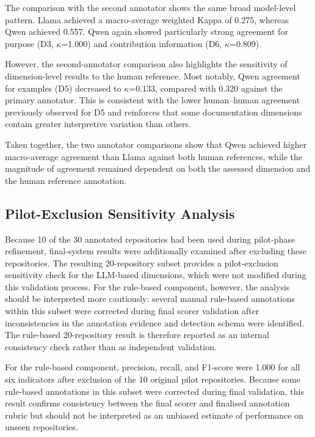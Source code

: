The comparison with the second annotator shows the same broad
model-level pattern. Llama achieved a macro-average weighted Kappa
of 0.275, whereas Qwen achieved 0.557. Qwen again showed particularly
strong agreement for purpose (D3, $\kappa$=1.000) and contribution
information (D6, $\kappa$=0.809).

However, the second-annotator comparison also highlights the
sensitivity of dimension-level results to the human reference.
Most notably, Qwen agreement for examples (D5) decreased to
$\kappa$=0.133, compared with 0.320 against the primary annotator.
This is consistent with the lower human--human agreement previously
observed for D5 and reinforces that some documentation dimensions
contain greater interpretive variation than others.

Taken together, the two annotator comparisons show that Qwen achieved
higher macro-average agreement than Llama against both human
references, while the magnitude of agreement remained dependent on
both the assessed dimension and the human reference annotation.

\subsection{Pilot-Exclusion Sensitivity Analysis}
\label{sec:pilot_exclusion_sensitivity}

Because 10 of the 30 annotated repositories had been used during
pilot-phase refinement, final-system results were additionally
examined after excluding these repositories. The resulting
20-repository subset provides a pilot-exclusion sensitivity check for
the LLM-based dimensions, which were not modified during this
validation process. For the rule-based component, however, the
analysis should be interpreted more cautiously: several manual
rule-based annotations within this subset were corrected during
final scorer validation after inconsistencies in the annotation
evidence and detection schema were identified. The rule-based
20-repository result is therefore reported as an internal consistency
check rather than as independent validation.

For the rule-based component, precision, recall, and F1-score were
1.000 for all six indicators after exclusion of the 10 original
pilot repositories. Because some rule-based annotations in this
subset were corrected during final validation, this result confirms
consistency between the final scorer and finalised annotation rubric
but should not be interpreted as an unbiased estimate of performance
on unseen repositories.

